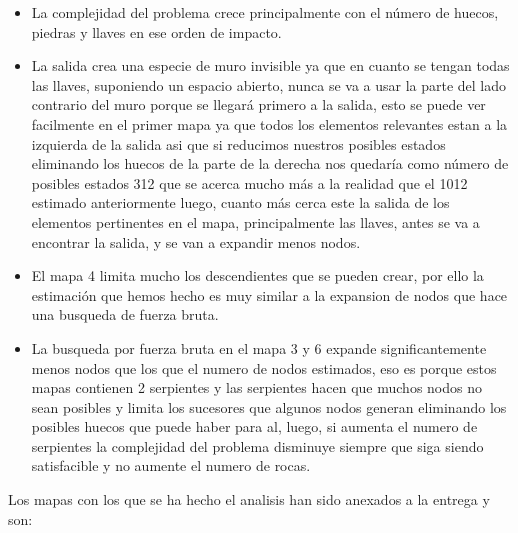 \documentclass[11pt,spanish]{article}
\begin{document}
			\begin{itemize}
				\item La complejidad del problema crece principalmente con el número de huecos, piedras y llaves en ese orden de impacto.
				\item La salida crea una especie de muro invisible ya que en cuanto se tengan todas las llaves, suponiendo un espacio abierto, nunca se va a usar la parte del lado contrario del muro porque se llegará primero a la salida, esto se puede ver facilmente en el primer mapa ya que todos los elementos relevantes estan a la izquierda de la salida asi que si reducimos nuestros posibles estados eliminando los huecos de la parte de la derecha nos quedaría como número de posibles estados 312 que se acerca mucho más a la realidad que el 1012 estimado anteriormente luego, cuanto más cerca este la salida de los elementos pertinentes en el mapa, principalmente las llaves, antes se va a encontrar la salida, y se van a expandir menos nodos.
				\item El mapa 4 limita mucho los descendientes que se pueden crear, por ello la estimación que hemos hecho es muy similar a la expansion de nodos que hace una busqueda de fuerza bruta.
				\item La busqueda por fuerza bruta en el mapa 3 y 6 expande significantemente menos nodos que los que el numero de nodos estimados, eso es porque estos mapas contienen 2 serpientes y las serpientes hacen que muchos nodos no sean posibles y limita los sucesores que algunos nodos generan eliminando los posibles huecos que puede haber para al, luego, si aumenta el numero de serpientes la complejidad del problema disminuye siempre que siga siendo satisfacible y no aumente el numero de rocas.
			\end{itemize}
			Los mapas con los que se ha hecho el analisis han sido anexados a la entrega y son:\\
\end{document}
